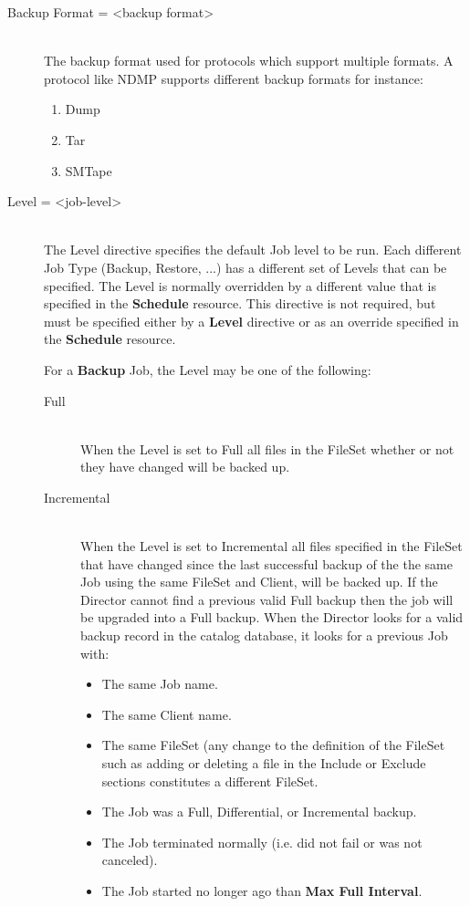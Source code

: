 \begin{description}
\item [Backup Format = {\textless}backup format{\textgreater}] \hfill \\
The backup format used for protocols which support multiple formats. A protocol
like NDMP supports different backup formats for instance:
\begin{enumerate}
\item Dump
\item Tar
\item SMTape
\end{enumerate}

\label{Level}
\item [Level = {\textless}job-level{\textgreater}] \hfill \\
The Level directive specifies the default Job level to be run.  Each
different Job Type (Backup, Restore, ...) has a different set of Levels
that can be specified.  The Level is normally overridden by a different
value that is specified in the {\bf Schedule} resource.  This directive
is not required, but must be specified either by a {\bf Level} directive
or as an override specified in the {\bf Schedule} resource.

For a {\bf Backup} Job, the Level may be one of the  following:

\begin{description}

\item [Full] \hfill \\
When the Level is set to Full all files in the FileSet whether or not
they have changed will be backed up.

\item [Incremental] \hfill \\
When the Level is set to Incremental all files specified in the FileSet
that have changed since the last successful backup of the the same Job
using the same FileSet and Client, will be backed up.  If the Director
cannot find a previous valid Full backup then the job will be upgraded
into a Full backup.  When the Director looks for a valid backup record
in the catalog database, it looks for a previous Job with:

\begin{itemize}
\item The same Job name.
\item The same Client name.
\item The same FileSet (any change to the definition of  the FileSet such as
adding or deleting a file in the  Include or Exclude sections constitutes a
different FileSet.
\item The Job was a Full, Differential, or Incremental backup.
\item The Job terminated normally (i.e. did not fail or was not  canceled).
\item The Job started no longer ago than {\bf Max Full Interval}.
\end{itemize}


\end{description}
\end{description}
